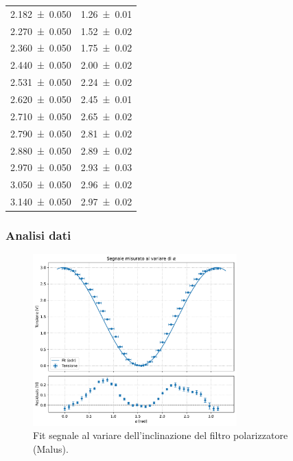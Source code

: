 \documentclass[a4paper]{article}
\begin{document}
\begin{table}[htbp]
\begin{tabular}{|c|c|}
\SI{2.182 \pm 0.050}{} & \SI{1.26 \pm 0.01}{} \\
\SI{2.270 \pm 0.050}{} & \SI{1.52 \pm 0.02}{} \\
\SI{2.360 \pm 0.050}{} & \SI{1.75 \pm 0.02}{} \\
\SI{2.440 \pm 0.050}{} & \SI{2.00 \pm 0.02}{} \\
\SI{2.531 \pm 0.050}{} & \SI{2.24 \pm 0.02}{} \\
\SI{2.620 \pm 0.050}{} & \SI{2.45 \pm 0.01}{} \\
\SI{2.710 \pm 0.050}{} & \SI{2.65 \pm 0.02}{} \\
\SI{2.790 \pm 0.050}{} & \SI{2.81 \pm 0.02}{} \\
\SI{2.880 \pm 0.050}{} & \SI{2.89 \pm 0.02}{} \\
\SI{2.970 \pm 0.050}{} & \SI{2.93 \pm 0.03}{} \\
\SI{3.050 \pm 0.050}{} & \SI{2.96 \pm 0.02}{} \\
\SI{3.140 \pm 0.050}{} & \SI{2.97 \pm 0.02}{} \\
\hline
\end{tabular}
\end{table}

\subsubsection{Analisi dati}
\begin{figure}[htbp]
	\centering
	\includegraphics[width=0.7\textwidth]{grafici/Malus.pdf}
	\caption{Fit segnale al variare dell'inclinazione del filtro polarizzatore (Malus).}
	\label{fig:Malus_grafico}
\end{figure}
\end{document}
